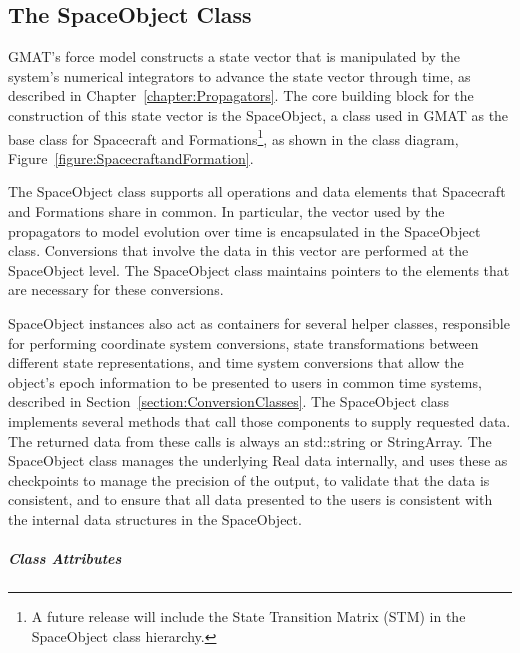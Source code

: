 \subsection{The SpaceObject Class}

GMAT's force model constructs a state vector that is manipulated by the system's numerical
integrators to advance the state vector through time, as described in
Chapter~\ref{chapter:Propagators}.  The core building block for the construction of this state
vector is the SpaceObject, a class used in GMAT as the base class for Spacecraft and
Formations\footnote{A future release will include the State Transition Matrix (STM) in the
SpaceObject class hierarchy.}, as shown in the class diagram,
Figure~\ref{figure:SpacecraftandFormation}.

The SpaceObject class supports all operations and data elements that Spacecraft and Formations share
in common.  In particular, the vector used by the propagators to model evolution over time is
encapsulated in the SpaceObject class.  Conversions that involve the data in this vector are
performed at the SpaceObject level.  The SpaceObject class maintains pointers to the elements that
are necessary for these conversions.

SpaceObject instances also act as containers for several helper classes, responsible for performing
coordinate system conversions, state transformations between different state representations, and
time system conversions that allow the object's epoch information to be presented to users in common
time systems, described in Section~\ref{section:ConversionClasses}. The SpaceObject class implements
several methods that call those components to supply requested data.  The returned data from these
calls is always an std::string or StringArray.  The SpaceObject class manages the underlying Real
data internally, and uses these as checkpoints to manage the precision of the output, to validate
that the data is consistent, and to ensure that all data presented to the users is consistent with
the internal data structures in the SpaceObject.

\subparagraph{\textit{Class Attributes}}

